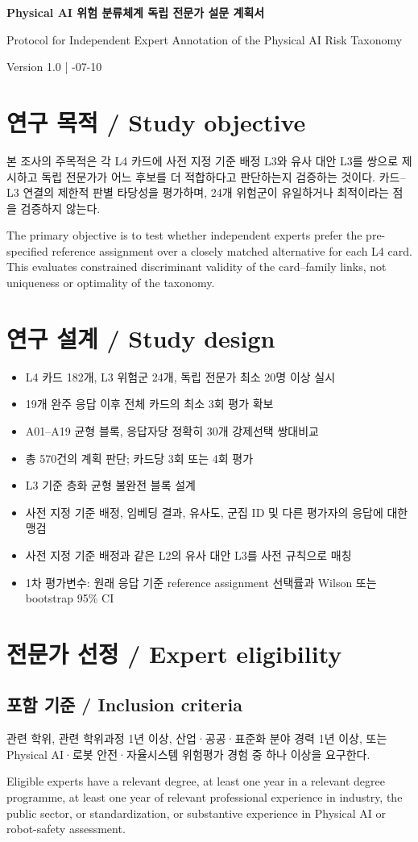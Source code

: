 \documentclass[11pt,a4paper]{article}
\newcommand{\bisection}[2]{\section{#1 / \texorpdfstring{\color{teal}}{}#2}}
\newcommand{\bisubsection}[2]{\subsection{#1 / #2}}
\begin{document}
\begin{center}
{\LARGE\bfseries\color{navy} Physical AI 위험 분류체계 독립 전문가 설문 계획서\par}
\vspace{5pt}
{\Large Protocol for Independent Expert Annotation of the Physical AI Risk Taxonomy\par}
\vspace{10pt}
Version 1.0 \quad | -07-10
\end{center}

\bisection{연구 목적}{Study objective}
본 조사의 주목적은 각 L4 카드에 사전 지정 기준 배정 L3와 유사 대안 L3를 쌍으로 제시하고 독립 전문가가 어느 후보를 더 적합하다고 판단하는지 검증하는 것이다. 카드--L3 연결의 제한적 판별 타당성을 평가하며, 24개 위험군이 유일하거나 최적이라는 점을 검증하지 않는다.

The primary objective is to test whether independent experts prefer the pre-specified reference assignment over a closely matched alternative for each L4 card. This evaluates constrained discriminant validity of the card--family links, not uniqueness or optimality of the taxonomy.

\bisection{연구 설계}{Study design}
\begin{itemize}
\item L4 카드 182개, L3 위험군 24개, 독립 전문가 최소 20명 이상 실시
\item 19개 완주 응답 이후 전체 카드의 최소 3회 평가 확보
\item A01--A19 균형 블록, 응답자당 정확히 30개 강제선택 쌍대비교
\item 총 570건의 계획 판단; 카드당 3회 또는 4회 평가
\item L3 기준 층화 균형 불완전 블록 설계
\item 사전 지정 기준 배정, 임베딩 결과, 유사도, 군집 ID 및 다른 평가자의 응답에 대한 맹검
\item 사전 지정 기준 배정과 같은 L2의 유사 대안 L3를 사전 규칙으로 매칭
\item 1차 평가변수: 원래 응답 기준 reference assignment 선택률과 Wilson 또는 bootstrap 95\% CI
\end{itemize}

\bisection{전문가 선정}{Expert eligibility}
\bisubsection{포함 기준}{Inclusion criteria}
관련 학위, 관련 학위과정 1년 이상, 산업·공공·표준화 분야 경력 1년 이상, 또는 Physical AI·로봇 안전·자율시스템 위험평가 경험 중 하나 이상을 요구한다.

Eligible experts have a relevant degree, at least one year in a relevant degree programme, at least one year of relevant professional experience in industry, the public sector, or standardization, or substantive experience in Physical AI or robot-safety assessment.
\end{document}
